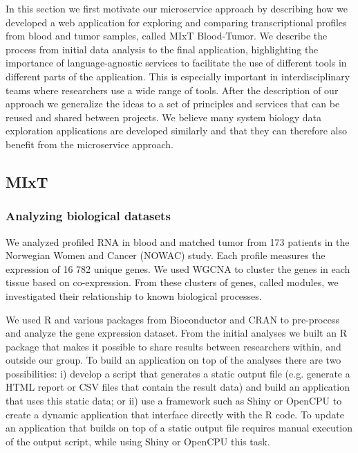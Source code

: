 In this section we first motivate our microservice approach by describing how we
developed a web application for exploring and comparing transcriptional profiles
from blood and tumor samples, called MIxT Blood-Tumor. We describe the process
from initial data analysis to the final application, highlighting the importance
of language-agnostic services to facilitate the use of different tools in
different parts of the application. This is especially important in
interdisciplinary teams where researchers use a wide range of tools. After the 
description of our approach we generalize the ideas to a set of principles and
services that can be reused and shared between projects. 
We believe
many system biology data exploration applications are developed similarly and
that they can therefore also benefit from the microservice approach. 




\subsection*{MIxT} 
\subsubsection*{Analyzing biological datasets} 
We analyzed profiled RNA in blood and matched tumor from 173 patients in the
Norwegian Women and Cancer (NOWAC) study. Each profile measures the expression
of 16 782 unique genes. We used WGCNA\cite{} to cluster the genes in each tissue
based on co-expression. From these clusters of genes, called modules, we
investigated their relationship to known biological processes. 

We used R and various packages from Bioconductor and CRAN to pre-process and
analyze the gene expression dataset.  From the initial analyses we built an R
package that makes it possible to share results between researchers within, and
outside our group. To build an application on top of the analyses there are two
possibilities: i) develop a script that generates a static output file (e.g.
generate a HTML report or CSV files that contain the result data) and build an
application that uses this static data; or ii) use a framework such as Shiny or
OpenCPU to create a dynamic application that interface directly with the R code.
To update an application that builds on top of a static output file requires
manual execution of the output script, while using Shiny or OpenCPU this task. 

